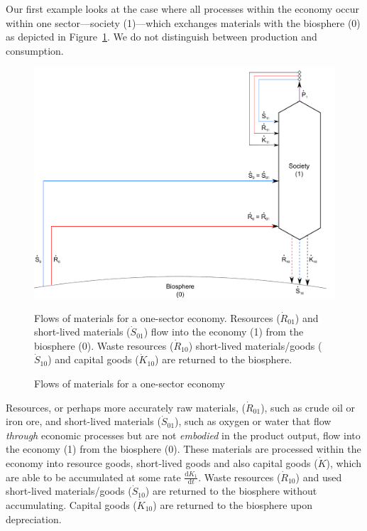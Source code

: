 Our first example looks at the case where all processes within the economy occur within
one sector---society (1)---which exchanges materials with the biosphere (0) as depicted in
Figure~\ref{fig:A_materials}.  We do not distinguish between production and consumption.

\begin{figure}[!ht]
\centering{}
\includegraphics[width=0.8\linewidth]{Part_1/Chapter_Materials/images/1_sector_materials.pdf}
\caption{Flows of materials for a one-sector economy}{Flows of materials 
for a one-sector economy. 
Resources ($\dot{R}_{01}$) and short-lived materials ($\dot{S}_{01}$) flow into the economy (1) 
from the biosphere (0). Waste resources ($\dot{R}_{10}$) short-lived materials/goods 
($\dot{S}_{10}$) and capital goods ($\dot{K}_{10}$) are returned to the biosphere.}
\label{fig:A_materials}
\end{figure}

Resources, or perhaps more accurately raw materials, 
($\dot{R}_{01}$), such as crude oil or iron ore, 
and short-lived materials ($\dot{S}_{01}$), 
such as oxygen or water that flow \emph{through} economic
processes but are not \emph{embodied} in the product output, 
flow into the economy (1) from the biosphere (0). 
These materials are processed within the economy into resource goods, 
short-lived goods and also capital goods ($\dot{K}$), 
which are able to be accumulated at some rate $\frac{\mathrm{d}K_{1}}{\mathrm{d}t}$.
Waste resources ($\dot{R}_{10}$) and used short-lived materials/goods ($\dot{S}_{10}$)
are returned to the biosphere without accumulating. Capital goods ($\dot{K}_{10}$) 
are returned to the biosphere upon depreciation.



